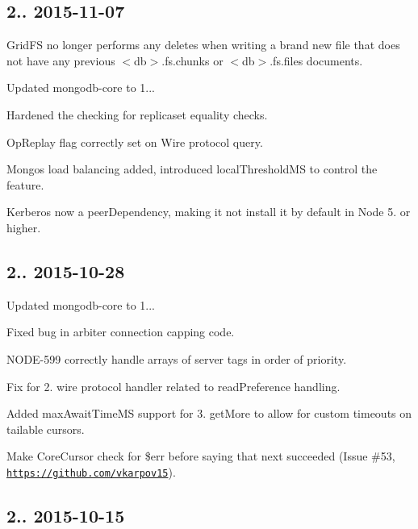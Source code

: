 \subsection*{2.. 2015-\/11-\/07 }


\begin{DoxyItemize}
\item Grid\+FS no longer performs any deletes when writing a brand new file that does not have any previous $<$db$>$.fs.\+chunks or $<$db$>$.fs.\+files documents.
\item Updated mongodb-\/core to 1...
\item Hardened the checking for replicaset equality checks.
\item Op\+Replay flag correctly set on Wire protocol query.
\item Mongos load balancing added, introduced local\+Threshold\+MS to control the feature.
\item Kerberos now a peer\+Dependency, making it not install it by default in Node 5. or higher.
\end{DoxyItemize}

\subsection*{2.. 2015-\/10-\/28 }


\begin{DoxyItemize}
\item Updated mongodb-\/core to 1...
\item Fixed bug in arbiter connection capping code.
\item N\+O\+D\+E-\/599 correctly handle arrays of server tags in order of priority.
\item Fix for 2. wire protocol handler related to read\+Preference handling.
\item Added max\+Await\+Time\+MS support for 3. get\+More to allow for custom timeouts on tailable cursors.
\item Make Core\+Cursor check for \$err before saying that \textquotesingle{}next\textquotesingle{} succeeded (Issue \#53, \href{https://github.com/vkarpov15}{\tt https\+://github.\+com/vkarpov15}).
\end{DoxyItemize}

\subsection*{2.. 2015-\/10-\/15 }



